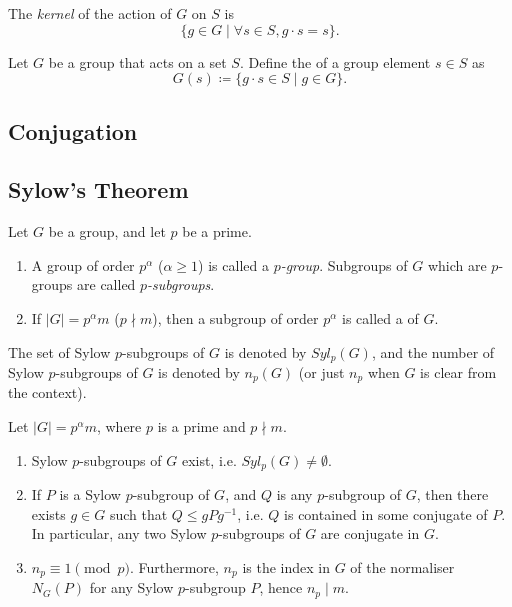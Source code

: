 \begin{definition}
The \emph{kernel} of the action of $G$ on $S$ is
\[\{g\in G\mid\forall s\in S, g\cdot s=s\}.\]
\end{definition}

\begin{definition}[Orbit]
Let $G$ be a group that acts on a set $S$. Define the  of a group element $s\in S$ as
\[G(s)\coloneqq\{g\cdot s\in S\mid g\in G\}.\]
\end{definition}

\subsection{Conjugation}

\subsection{Sylow's Theorem}
\begin{definition}
Let $G$ be a group, and let $p$ be a prime.
\begin{enumerate}[label=(\roman*)]
\item A group of order $p^\alpha$ ($\alpha\ge1$) is called a \emph{$p$-group}. Subgroups of $G$ which are $p$-groups are called \emph{$p$-subgroups}.
\item If $|G|=p^\alpha m$ ($p\nmid m$), then a subgroup of order $p^\alpha$ is called a  of $G$.
\end{enumerate}
\end{definition}

\begin{notation}
The set of Sylow $p$-subgroups of $G$ is denoted by $Syl_p(G)$, and the number of Sylow $p$-subgroups of $G$ is denoted by $n_p(G)$ (or just $n_p$ when $G$ is clear from the context).
\end{notation}

\begin{theorem}
Let $|G|=p^\alpha m$, where $p$ is a prime and $p\nmid m$.
\begin{enumerate}[label=(\roman*)]
\item Sylow $p$-subgroups of $G$ exist, i.e. $Syl_p(G)\neq\emptyset$.
\item If $P$ is a Sylow $p$-subgroup of $G$, and $Q$ is any $p$-subgroup of $G$, then there exists $g\in G$ such that $Q\le gPg^{-1}$, i.e. $Q$ is contained in some conjugate of $P$. In particular, any two Sylow $p$-subgroups of $G$ are conjugate in $G$.
\item $n_p\equiv1\pmod p$. Furthermore, $n_p$ is the index in $G$ of the normaliser $N_G(P)$ for any Sylow $p$-subgroup $P$, hence $n_p\mid m$.
\end{enumerate}
\end{theorem}
\pagebreak

